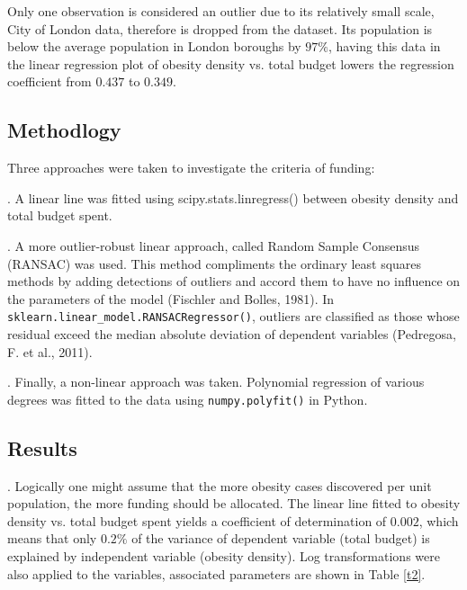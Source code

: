 \documentclass[12pt]{article}
\begin{document}
Only one observation is considered an outlier due to its relatively small scale, City of London data,  therefore is dropped from the dataset. Its population is below the average population in London boroughs by $97\%$, having this data in the linear regression plot of obesity density vs. total budget lowers the regression coefficient from $0.437$ to $0.349$. 


\subsection{Methodlogy}
Three approaches were taken to investigate the criteria of funding:

. 
A linear line was fitted using scipy.stats.linregress() between obesity density and total budget spent. 


.
A more outlier-robust linear approach, called Random Sample Consensus (RANSAC) was used. This method compliments the ordinary least squares methods by adding detections of outliers and accord them to have no influence on the parameters of the model (Fischler and Bolles, 1981). In \verb|sklearn.linear_model.RANSACRegressor()|, outliers are classified as those whose residual exceed the median absolute deviation of dependent variables (Pedregosa, F. et al., 2011).

.
Finally, a non-linear approach was taken. Polynomial regression of various degrees was fitted to the data using \verb|numpy.polyfit()| in Python. 


\subsection{Results}
. Logically one might assume that the more obesity cases discovered per unit population, the more funding should be allocated. 
The linear line fitted to obesity density vs. total budget spent yields a coefficient of determination of $0.002$, which means that only $0.2\%$ of the variance of dependent variable (total budget) is explained by independent variable (obesity density). Log transformations were also applied to the variables, associated parameters are shown in Table \eqref{t2}. 
\end{document}
